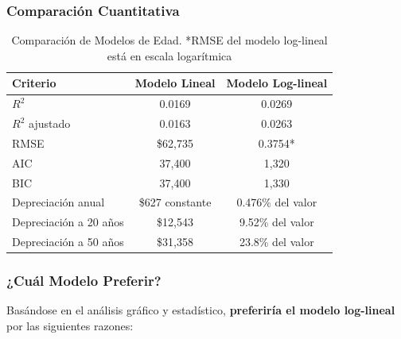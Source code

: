 \documentclass[12pt]{article}
\begin{document}
\subsubsection*{Comparación Cuantitativa}

\begin{table}[h]
\centering
\begin{tabular}{lcc}
\hline
\textbf{Criterio} & \textbf{Modelo Lineal} & \textbf{Modelo Log-lineal} \\
\hline
$R^2$ & 0.0169 & 0.0269 \\
$R^2$ ajustado & 0.0163 & 0.0263 \\
RMSE & \$62,735 & 0.3754* \\
AIC & 37,400 & 1,320 \\
BIC & 37,400 & 1,330 \\
\hline
Depreciación anual & \$627 constante & 0.476\% del valor \\
Depreciación a 20 años & \$12,543 & 9.52\% del valor \\
Depreciación a 50 años & \$31,358 & 23.8\% del valor \\
\hline
\end{tabular}
\caption{Comparación de Modelos de Edad. *RMSE del modelo log-lineal está en escala logarítmica}
\label{tab:age_comparison}
\end{table}

\subsubsection*{¿Cuál Modelo Preferir?}

Basándose en el análisis gráfico y estadístico, \textbf{preferiría el modelo log-lineal} por las siguientes razones:
\end{document}
